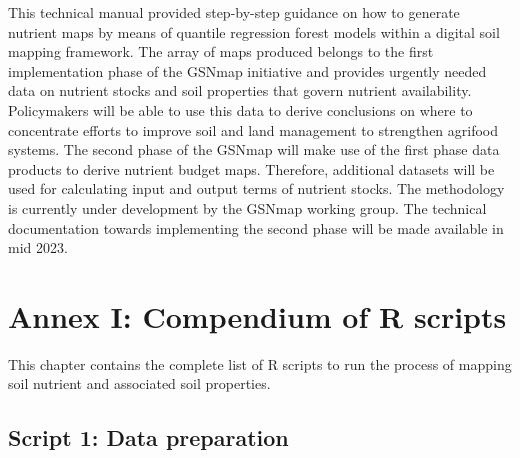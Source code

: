 \documentclass[
  10pt,
  b5paper,
  oneside]{book}
\begin{document}
This technical manual provided step-by-step guidance on how to generate nutrient maps by means of quantile regression forest models within a digital soil mapping framework. The array of maps produced belongs to the first implementation phase of the GSNmap initiative and provides urgently needed data on nutrient stocks and soil properties that govern nutrient availability. Policymakers will be able to use this data to derive conclusions on where to concentrate efforts to improve soil and land management to strengthen agrifood systems.
The second phase of the GSNmap will make use of the first phase data products to derive nutrient budget maps. Therefore, additional datasets will be used for calculating input and output terms of nutrient stocks. The methodology is currently under development by the GSNmap working group. The technical documentation towards implementing the second phase will be made available in mid 2023.

\hypertarget{annex-i-compendium-of-r-scripts}{%
\chapter*{Annex I: Compendium of R scripts}\label{annex-i-compendium-of-r-scripts}}

This chapter contains the complete list of R scripts to run the process of mapping soil nutrient and associated soil properties.

\hypertarget{script-1-data-preparation}{%
\section*{Script 1: Data preparation}\label{script-1-data-preparation}}
\end{document}
